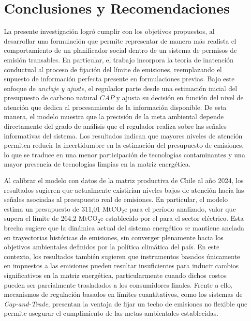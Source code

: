 \chapter{Conclusiones y Recomendaciones}
\label{c5} %


La presente investigación logró cumplir con los objetivos propuestos, al desarrollar una formulación que permite representar de manera más realista el comportamiento de un planificador social dentro de un sistema de permisos de emisión transables. En particular, el trabajo incorpora la teoría de inatención conductual al proceso de fijación del límite de emisiones, reemplazando el supuesto de información perfecta presente en formulaciones previas. Bajo este enfoque de \textit{anclaje y ajuste}, el regulador parte desde una estimación inicial del presupuesto de carbono natural $CAP$ y ajusta su decisión en función del nivel de atención que dedica al procesamiento de la información disponible. De esta manera, el modelo muestra que la precisión de la meta ambiental depende directamente del grado de análisis que el regulador realiza sobre las señales informativas del sistema. Los resultados indican que mayores niveles de atención permiten reducir la incertidumbre en la estimación del presupuesto de emisiones, lo que se traduce en una menor participación de tecnologías contaminantes y una mayor presencia de tecnologías limpias en la matriz energética. \medskip

Al calibrar el modelo con datos de la matriz productiva de Chile al año 2024, los resultados sugieren que actualmente existirían niveles bajos de atención hacia las señales asociadas al presupuesto real de emisiones. En particular, el modelo estima un presupuesto de 311,01 MtCO$_2$e para el período analizado, valor que supera el límite de 264,2 MtCO$_2$e establecido por el  para el sector eléctrico. Esta brecha sugiere que la dinámica actual del sistema energético se mantiene anclada en trayectorias históricas de emisiones, sin converger plenamente hacia los objetivos ambientales definidos por la política climática del país. En este contexto, los resultados también sugieren que instrumentos basados únicamente en impuestos a las emisiones pueden resultar insuficientes para inducir cambios significativos en la matriz energética, particularmente cuando dichos costos pueden ser parcialmente trasladados a los consumidores finales. Frente a ello, mecanismos de regulación basados en límites cuantitativos, como los sistemas de \textit{Cap-and-Trade}, presentan la ventaja de fijar un techo de emisiones no flexible que permite asegurar el cumplimiento de las metas ambientales establecidas. \medskip

